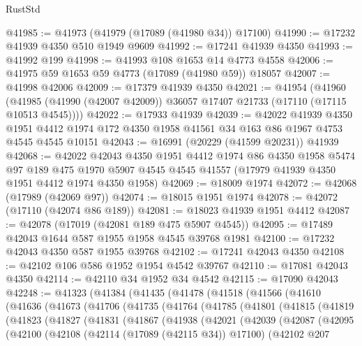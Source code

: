 \begin{lexlean}{RustStd}
\begin{coremodule}
@41985 := @41973 (@41979 (@17089 (@41980 @34)) @17100)
@41990 := @17232 @41939 @4350 @510 @1949 @9609
@41992 := @17241 @41939 @4350
@41993 := @41992 @199
@41998 := @41993 @108 @1653 @14 @4773 @4558
@42006 := @41975 @59 @1653 @59 @4773 (@17089 (@41980 @59)) @18057
@42007 := @41998 @42006
@42009 := @17379 @41939 @4350
@42021 := @41954
    (@41960 (@41985 (@41990 (@42007 @42009)) @36057 @17407 @21733 (@17110 (@17115 @10513 @4545))))
@42022 := @17933 @41939
@42039 := @42022
    @41939
    @4350
    @1951
    @4412
    @1974
    @172
    @4350
    @1958
    @41561
    @34
    @163
    @86
    @1967
    @4753
    @4545
    @4545
    @10151
@42043 := @16991 (@20229 (@41599 @20231)) @41939
@42068 := @42022
    @42043
    @4350
    @1951
    @4412
    @1974
    @86
    @4350
    @1958
    @5474
    @97
    @189
    @475
    @1970
    @5907
    @4545
    @4545
    @41557
    (@17979 @41939 @4350 @1951 @4412 @1974 @4350 @1958)
@42069 := @18009 @1974
@42072 := @42068 (@17989 (@42069 @97))
@42074 := @18015 @1951 @1974
@42078 := @42072 (@17110 (@42074 @86 @189))
@42081 := @18023 @41939 @1951 @4412
@42087 := @42078 (@17019 (@42081 @189 @475 @5907 @4545))
@42095 := @17489 @42043 @1644 @587 @1955 @1958 @4545 @39768 @1981
@42100 := @17232 @42043 @4350 @587 @1955 @39768
@42102 := @17241 @42043 @4350
@42108 := @42102 @106 @586 @1952 @1954 @4542 @39767
@42110 := @17081 @42043 @4350
@42114 := @42110 @34 @1952 @34 @4542
@42115 := @17090 @42043
@42248 := @41323
    (@41384
      (@41435
        (@41478
          (@41518
            (@41566
              (@41610
                (@41636
                  (@41673
                    (@41706
                      (@41735
                        (@41764
                          (@41785
                            (@41801
                              (@41815
                                (@41819
                                  (@41823
                                    (@41827
                                      (@41831
                                        (@41867
                                          (@41938
                                            (@42021
                                              (@42039
                                                (@42087
                                                  (@42095
                                                    (@42100
                                                      (@42108
                                                        (@42114 (@17089 (@42115 @34)) @17100)
                                                        (@42102
                                                          @207

\end{coremodule}
\end{lexlean}
